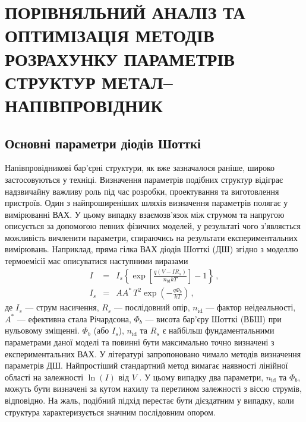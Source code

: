 \chapter{\MakeUppercase{Порівняльний аналіз та оптимізація методів розрахунку параметрів структур метал--напівпровідник}\label{Ch_MSMethod}}


\section{Основні параметри діодів Шотткі}
Напівпровідникові бар'єрні структури, як вже зазначалося раніше, широко застосовуються у техніці.
Визначення параметрів подібних структур відіграє надзвичайну важливу роль під час розробки, проектування та виготовлення пристроїв.
Один з найпроширеніших шляхів визначення параметрів полягає у вимірюванні ВАХ.
У цьому випадку взаємозв'язок між струмом та напругою описується за допомогою певних фізичних моделей, у
результаті чого з'являється можливість вичленити параметри, спираючись на результати експериментальних вимірювань.
Наприклад, пряма гілка ВАХ діодів Шотткі (ДШ) згідно з моделлю термоемісії має описуватися \cite{Rhoderick1988} наступними виразами
\begin{eqnarray}
\label{eqSDIV}
I&=&I_s\left\{\exp\left[\frac{q(V-IR_s)}{n_\mathrm{id}kT}\right]-1\right\}\,,\\
\label{eqSDIs}
I_s&=&AA^*\,T^2\exp\left(-\frac{q\Phi_b}{kT}\right)\,,
\end{eqnarray}
де
$I_s$ --- струм насичення,
$R_s$ --- послідовний опір,
$n_\mathrm{id}$ --- фактор неідеальності,
$A^*$ --- ефективна стала Річардсона,
$\Phi_b$ --- висота бар'єру Шотткі (ВБШ) при нульовому зміщенні.
$\Phi_b$ (або $I_s$), $n_\mathrm{id}$ та $R_s$ є найбільш фундаментальними параметрами даної моделі та повинні бути максимально точно визначені з експериментальних ВАХ.
У літературі запропоновано чимало методів визначення параметрів ДШ.
Найпростіший стандартний метод вимагає наявності лінійної області на залежності $\ln(I)$ від  $V$ \cite{Sze2012,Rhoderick1988}.
У цьому випадку два параметри, $n_\mathrm{id}$ та $\Phi_b$, можуть бути визначені за кутом нахилу та перетином  залежності з віссю струмів, відповідно.
На жаль, подібний підхід перестає бути дієздатним у випадку, коли структура характеризується значним послідовним опором.
